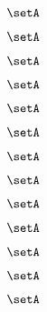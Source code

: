 \begin{forslides}
    \begin{equation}
        \label{eq:slides-processes-136}
        \setA
    \end{equation}

    \begin{equation}
        \label{eq:slides-processes-137}
        \setA
    \end{equation}

    \begin{equation}
        \label{eq:slides-processes-138}
        \setA
    \end{equation}

    \begin{equation}
        \label{eq:slides-processes-139}
        \setA
    \end{equation}
    
    \begin{equation}
        \label{eq:slides-processes-140}
        \setA
    \end{equation}

    \begin{equation}
        \label{eq:slides-processes-141}
        \setA
    \end{equation}

    \begin{equation}
        \label{eq:slides-processes-142}
        \setA
    \end{equation}

    \begin{equation}
        \label{eq:slides-processes-143}
        \setA
    \end{equation}

    \begin{equation}
        \label{eq:slides-processes-144}
        \setA
    \end{equation}

    \begin{equation}
        \label{eq:slides-processes-145}
        \setA
    \end{equation}

    \begin{equation}
        \label{eq:slides-processes-146}
        \setA
    \end{equation}

    \begin{equation}
        \label{eq:slides-processes-147}
        \setA
    \end{equation}

    \begin{equation}
        \label{eq:slides-processes-148}
        \setA
    \end{equation}


\end{forslides}

